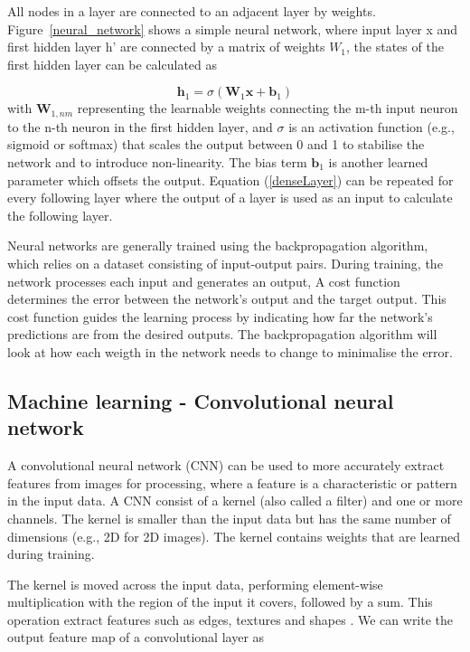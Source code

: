 \documentclass{article}
\begin{document}
All nodes in a layer are connected to an adjacent layer by weights. Figure~\ref{neural_network} shows a simple neural network, where input layer x and first hidden layer h' are connected by a matrix of weights $W_1$, the states of the first hidden layer can be calculated as

\begin{equation}
\label{denseLayer}
\mathbf{h}_1 = \sigma(\mathbf{W}_1 \mathbf{x} + \mathbf{b}_1)
\end{equation}
with $\mathbf{W}_{1,nm}$ representing the learnable weights connecting the m-th input neuron to the n-th neuron in the first hidden layer, and $\sigma$ is an activation function (e.g., sigmoid or softmax) that scales the output between 0 and 1 to stabilise the network and to introduce non-linearity. The bias term $\mathbf{b}_1$ is another learned parameter which offsets the output. Equation (\ref{denseLayer}) can be repeated for every following layer where the output of a layer is used as an input to calculate the following layer.

Neural networks are generally trained using the backpropagation algorithm, which relies on a dataset consisting of input-output pairs. During training, the network processes each input and generates an output, A cost function determines the error between the network's output and the target output. This cost function guides the learning process by indicating how far the network's predictions are from the desired outputs. The backpropagation algorithm will look at how each weigth in the network needs to change to minimalise the error.

\subsection{Machine learning - Convolutional neural network}

A convolutional neural network (CNN) can be used to more accurately extract features from images for processing, where a feature is a characteristic or pattern in the input data. A CNN consist of a kernel (also called a filter) and one or more channels. The kernel is smaller than the input data but has the same number of dimensions (e.g., 2D for 2D images). The kernel contains weights that are learned during training.

The kernel is moved across the input data, performing element-wise multiplication with the region of the input it covers, followed by a sum. This operation extract features such as edges, textures and shapes \citep{yamashita2018convolutional}. We can write the output feature map of a convolutional layer as
\end{document}
